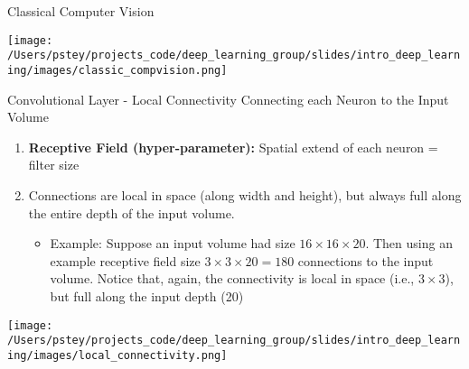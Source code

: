 \documentclass[pdf]{beamer}
\begin{document}
	\begin{frame}{Classical Computer Vision}
	\begin{center}
		\texttt{[image: /Users/pstey/projects\_code/deep\_learning\_group/slides/intro\_deep\_learning/images/classic\_compvision.png]}
	\end{center}
	\end{frame}

	\begin{frame}{Convolutional Layer - Local Connectivity}
	Connecting each Neuron to the Input Volume
	\vspace{1em}
	\begin{enumerate}
		\item \textbf{Receptive Field (hyper-parameter):} Spatial extend of each neuron = filter size
		\item Connections are local in space (along width and height), but always full along the entire depth of the input volume.
			\vspace{1em}
			\begin{itemize}
				\item Example: Suppose an input volume had size $16 \times 16 \times 20$. Then using an example receptive field size $3 \times 3 \times 20 = 180$ connections to the input volume. Notice that, again, the connectivity is local in space (i.e., $3 \times 3$), but full along the input depth (20)
			\end{itemize}
	\end{enumerate}
	\begin{center}
		\texttt{[image: /Users/pstey/projects\_code/deep\_learning\_group/slides/intro\_deep\_learning/images/local\_connectivity.png]}
	\end{center}
	\end{frame}
\end{document}
